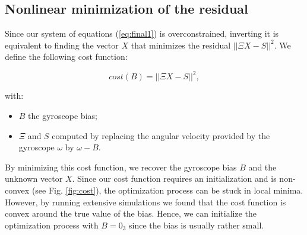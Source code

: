 \documentclass[letterpaper, 10 pt, conference]{ieeeconf}  %
\begin{document}
%


\subsection{Nonlinear minimization of the residual}

Since our system of equations (\ref{eq:final1}) is overconstrained,
inverting it is equivalent to finding the vector $X$ that minimizes the residual $||\Xi X - S||^2$.
We define the following cost function:

\begin{equation}
  \label{eq:cost}
  cost(B) = ||\Xi X - S||^2,
\end{equation}

\noindent with:
\begin{itemize}
\item $B$ the gyroscope bias;
\item $\Xi$ and $S$ computed by replacing the angular velocity provided by the gyroscope $\omega$ by $\omega - B$.
\end{itemize}

By minimizing this cost function, we recover the gyroscope bias $B$ and the unknown vector $X$.
Since our cost function requires an initialization and is non-convex (see Fig. \ref{fig:cost}),
the optimization process can be stuck in local minima.
However, by running extensive simulations we found that the cost function is convex around the true value of the bias. Hence, we can initialize the optimization process with $B = 0_3$ since the bias is usually rather small.
\end{document}
